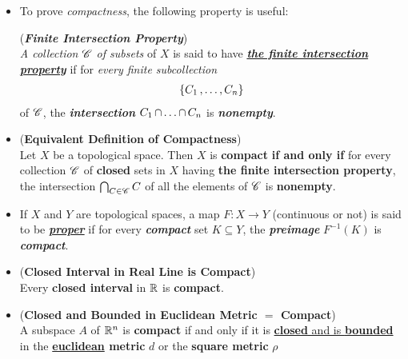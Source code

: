 \documentclass[11pt]{article}
\begin{document}
\begin{itemize}
\item To prove \emph{compactness}, the following property is useful:
\begin{definition} (\emph{\textbf{Finite Intersection Property}})\\
\emph{A collection ${\mathscr C}$ of subsets} of $X$ is said to have \underline{\emph{\textbf{the finite intersection property}}} if for \emph{every finite subcollection}
\begin{align*}
\{C_1 \,{,}\ldots{,}\, C_n\}
\end{align*}
 of ${\mathscr C}$, the \emph{\textbf{intersection}} $C_1 \,{\cap}\ldots{\cap}\, C_n$ is \emph{\textbf{nonempty}}.
\end{definition}

\item \begin{proposition} (\textbf{Equivalent Definition of Compactness}) \citep{munkres2000topology} \\
Let $X$ be a topological space. Then $X$ is \textbf{compact} \textbf{if and only if} for every collection ${\mathscr C}$ of \textbf{closed} sets in $X$ having \textbf{the finite intersection property}, the intersection $\bigcap_{C\in {\mathscr C}}C$ of all the elements of ${\mathscr C}$ is \textbf{nonempty}.
\end{proposition}

\item \begin{definition}
If $X$ and $Y$ are topological spaces, a map $F: X \rightarrow Y$ (continuous or not) is said to be \underline{\emph{\textbf{proper}}} if for every \textbf{\emph{compact}} set $K \subseteq Y$, the \emph{\textbf{preimage}} $F^{-1}(K)$ is \emph{\textbf{compact}}.
\end{definition}

\item \begin{corollary} (\textbf{Closed Interval in Real Line is Compact})\citep{munkres2000topology}\\
Every \textbf{closed interval} in ${\mathbb R}$ is \textbf{compact}.
\end{corollary}

\item \begin{proposition}  (\textbf{Closed and Bounded in Euclidean Metric $=$ Compact})\citep{munkres2000topology}\\
A subspace $A$ of ${\mathbb R}^n$ is \textbf{compact} if and only if it is \underline{\textbf{closed} and is \textbf{bounded}} in the \textbf{\underline{euclidean} metric} $d$ or the \textbf{square metric} $\rho$
\end{proposition}


\end{itemize}
\end{document}
